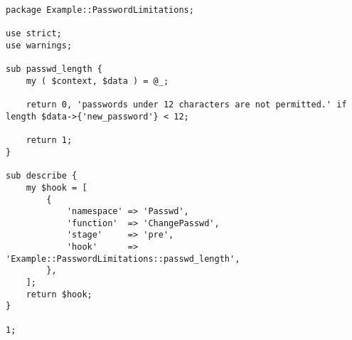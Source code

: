 \begin{verbatim}
package Example::PasswordLimitations;

use strict;
use warnings;

sub passwd_length {
    my ( $context, $data ) = @_;

    return 0, 'passwords under 12 characters are not permitted.' if length $data->{'new_password'} < 12;

    return 1;
}

sub describe {
    my $hook = [
        {
            'namespace' => 'Passwd',
            'function'  => 'ChangePasswd',
            'stage'     => 'pre',
            'hook'      => 'Example::PasswordLimitations::passwd_length',
        },
    ];
    return $hook;
}

1;
\end{verbatim}
